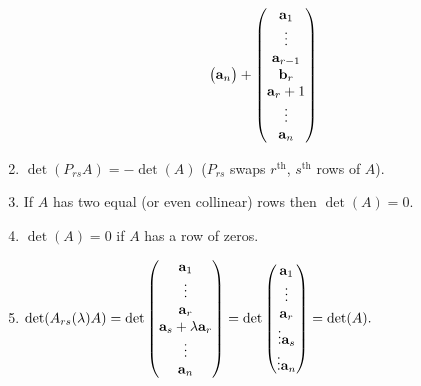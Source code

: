 \documentclass[10pt, a4paper]{article}
\begin{document}
\begin{enumerate}[label = (\roman*)]
\[\begin{pmatrix}
    \mathbf{a}_n
    \end{pmatrix}
    +\begin{pmatrix}
        \mathbf{a}_1 \\
        \vdots \\
        \mathbf{a}_{r - 1} \\
        \mathbf{b}_r \\
        \mathbf{a}_r + 1 \\
        \vdots \\
        \mathbf{a}_n
    \end{pmatrix}
    \]
    \item $\det(P_{rs}A) = -\det(A)$
    ($P_{rs}$ swaps $r ^ {\text{th}}$, $s ^ {\text{th}}$ rows of $A$).
    \item If $A$ has two equal (or even collinear) rows then $\det(A) = 0$.
    \item $\det(A) = 0$ if $A$ has a row of zeros.
    \item $\det(A_{rs}(\lambda)A) = \det\begin{pmatrix}
        \mathbf{a}_1 \\ \vdots \\ \mathbf{a}_r \\ \mathbf{a}_s + \lambda \mathbf{a}_r \\ \vdots \\ \mathbf{a}_n\end{pmatrix} = \det\begin{pmatrix}
            \mathbf{a}_1 \\ \vdots \\ \mathbf{a}_r \\ \vdots \mathbf{a}_s \\ \vdots \mathbf{a}_n
        \end{pmatrix} = \det(A).$
\end{enumerate}
\end{document}
